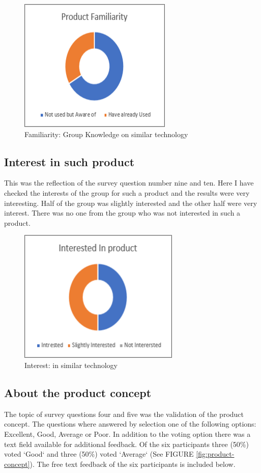 \begin{figure}[ht]
    \centering
    \includegraphics[scale=0.6]{Figures/product-familarity.png}
    \caption{Familiarity: Group Knowledge on similar technology }
    \label{fig:product-familarity}
\end{figure}
 \FloatBarrier

\subsection{Interest in such product}
\label{sec:interest}
This was the reflection of the survey question number nine and ten. Here I have checked the interests of the group for such a product and the results were very interesting. 
Half of the group was slightly interested 
and the other half were very interest. 
There was no one from the group who was not interested in such a product. 

\begin{figure}[ht]
    \centering
    \includegraphics[scale=0.6]{Figures/product-interest.png}
    \caption{Interest: in similar technology}
    \label{fig:product-interest}
\end{figure}
 \FloatBarrier

\subsection{About the product concept}
\label{sec:concept}
 The topic of survey questions four and five was the validation of the product concept. 
 The questions where answered by selection one of the following options: Excellent, Good, Average or Poor. 
 In addition to the voting option there was a text field available for additional feedback. 
 Of the six participants three (50\%) voted `Good` and three (50\%) voted `Average` 
 (See FIGURE \ref{fig:product-concept}).
The free text feedback of the six participants
is included below.

